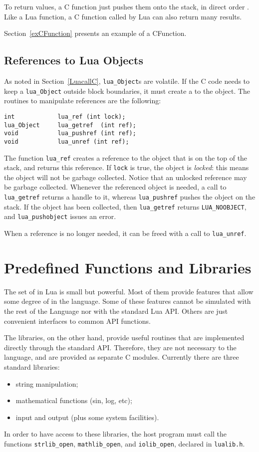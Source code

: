 To return values, a C function just pushes them onto the stack,
in direct order .
Like a Lua function, a C function called by Lua can also return
many results.

Section~\ref{exCFunction} presents an example of a CFunction.


\subsection{References to Lua Objects}

As noted in Section~\ref{LuacallC}, \verb'lua_Object's are volatile.
If the C code needs to keep a \verb'lua_Object'
outside block boundaries,
it must create a  to the object.
The routines to manipulate references are the following:
\begin{verbatim}
int            lua_ref (int lock);
lua_Object     lua_getref  (int ref);
void           lua_pushref (int ref);
void           lua_unref (int ref);
\end{verbatim}
The function \verb'lua_ref' creates a reference
to the object that is on the top of the stack,
and returns this reference.
If \verb'lock' is true, the object is {\em locked\/}:
this means the object will not be garbage collected.
Notice that an unlocked reference may be garbage collected.
Whenever the referenced object is needed,
a call to \verb'lua_getref'
returns a handle to it,
whereas \verb'lua_pushref' pushes the object on the stack.
If the object has been collected,
then \verb'lua_getref' returns \verb'LUA_NOOBJECT',
and \verb'lua_pushobject' issues an error.

When a reference is no longer needed,
it can be freed with a call to \verb'lua_unref'.



\section{Predefined Functions and Libraries}

The set of  in Lua is small but powerful.
Most of them provide features that allow some degree of
 in the language.
Some of these features cannot be simulated with the rest of the
Language nor with the standard Lua API.
Others are just convenient interfaces to common API functions.

The libraries, on the other hand, provide useful routines
that are implemented directly through the standard API.
Therefore, they are not necessary to the language,
and are provided as separate C modules.
Currently there are three standard libraries:
\begin{itemize}
\item string manipulation;
\item mathematical functions (sin, log, etc);
\item input and output (plus some system facilities).
\end{itemize}
In order to have access to these libraries,
the host program must call the functions
\verb-strlib_open-, \verb-mathlib_open-, and \verb-iolib_open-,
declared in \verb-lualib.h-.


